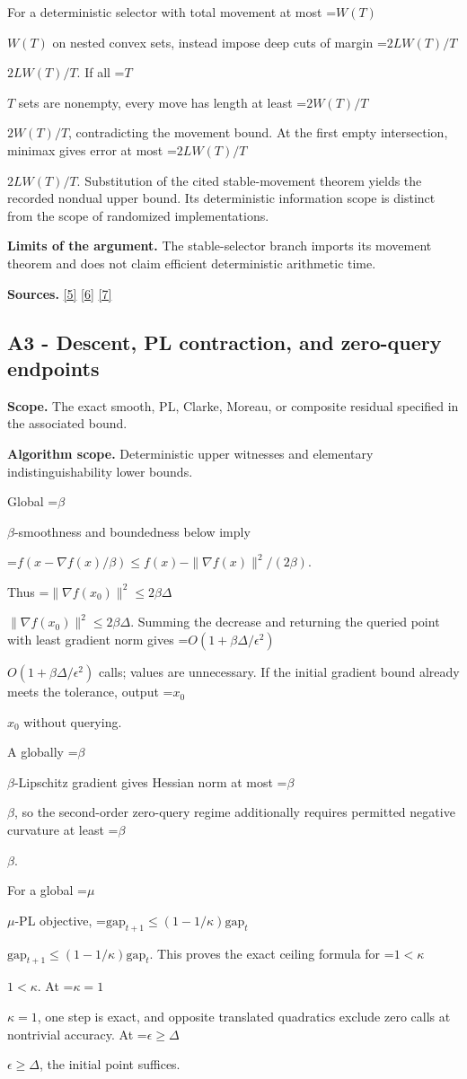 \documentclass[10pt,a4paper]{article}
\newcommand{\AtlasMath}[1]{\par\begingroup\centering\setbox0=\hbox{$\displaystyle #1$}\ifdim\wd0>1.4\linewidth\typeout{ATLAS WIDE FORMULA: \the\wd0}\fi\ifdim\wd0>\linewidth\resizebox{\linewidth}{!}{\box0}\else\box0\fi\par\endgroup}
\newcommand{\AtlasInlineMath}[1]{\begingroup\setbox0=\hbox{$#1$}\ifdim\wd0>.4\linewidth\endgroup\AtlasMath{#1}\else\endgroup$#1$\fi}
\begin{document}
For a deterministic selector with total movement at most \AtlasInlineMath{W(T)} on nested convex sets, instead impose deep cuts of margin \AtlasInlineMath{2LW(T)/T}. If all \AtlasInlineMath{T} sets are nonempty, every move has length at least \AtlasInlineMath{2W(T)/T}, contradicting the movement bound. At the first empty intersection, minimax gives error at most \AtlasInlineMath{2LW(T)/T}. Substitution of the cited stable-movement theorem yields the recorded nondual upper bound. Its deterministic information scope is distinct from the scope of randomized implementations.

\textbf{Limits of the argument.} The stable-selector branch imports its movement theorem and does not claim efficient deterministic arithmetic time.

\textbf{Sources.} \href{https://arxiv.org/pdf/1405.4980}{[5]} \href{https://www2.isye.gatech.edu/~nemirovs/MOR_AccuracyCertificates.pdf}{[6]} \href{https://arxiv.org/pdf/2609.20701}{[7]}

\subsection{A3 - Descent, PL contraction, and zero-query endpoints}
\textbf{Scope.} The exact smooth, PL, Clarke, Moreau, or composite residual specified in the associated bound.

\textbf{Algorithm scope.} Deterministic upper witnesses and elementary indistinguishability lower bounds.

Global \AtlasInlineMath{\beta}-smoothness and boundedness below imply

\AtlasMath{f(x-\nabla f(x)/\beta)\le f(x)-\|\nabla f(x)\|^2/(2\beta).}

Thus \AtlasInlineMath{\|\nabla f(x_0)\|^2\le2\beta\Delta}. Summing the decrease and returning the queried point with least gradient norm gives \AtlasInlineMath{O(1+\beta\Delta/\epsilon^2)} calls; values are unnecessary. If the initial gradient bound already meets the tolerance, output \AtlasInlineMath{x_0} without querying.

A globally \AtlasInlineMath{\beta}-Lipschitz gradient gives Hessian norm at most \AtlasInlineMath{\beta}, so the second-order zero-query regime additionally requires permitted negative curvature at least \AtlasInlineMath{\beta}.

For a global \AtlasInlineMath{\mu}-PL objective,
\AtlasInlineMath{\mathrm{gap}_{t+1}\le(1-1/\kappa)\mathrm{gap}_t}.
This proves the exact ceiling formula for \AtlasInlineMath{1<\kappa}. At \AtlasInlineMath{\kappa=1}, one step is exact, and opposite translated quadratics exclude zero calls at nontrivial accuracy. At \AtlasInlineMath{\epsilon\ge\Delta}, the initial point suffices.
\end{document}
